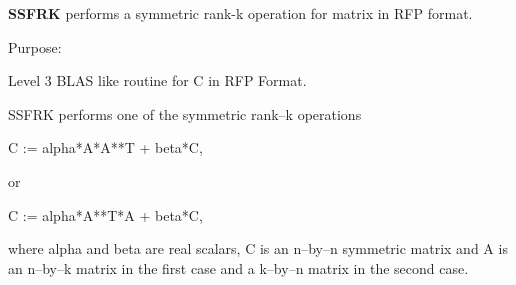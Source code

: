 {\bfseries S\+S\+F\+R\+K} performs a symmetric rank-\/k operation for matrix in R\+F\+P format. 

 \begin{DoxyParagraph}{Purpose\+: }
\begin{DoxyVerb} Level 3 BLAS like routine for C in RFP Format.

 SSFRK performs one of the symmetric rank--k operations

    C := alpha*A*A**T + beta*C,

 or

    C := alpha*A**T*A + beta*C,

 where alpha and beta are real scalars, C is an n--by--n symmetric
 matrix and A is an n--by--k matrix in the first case and a k--by--n
 matrix in the second case.\end{DoxyVerb}
 
\end{DoxyParagraph}

